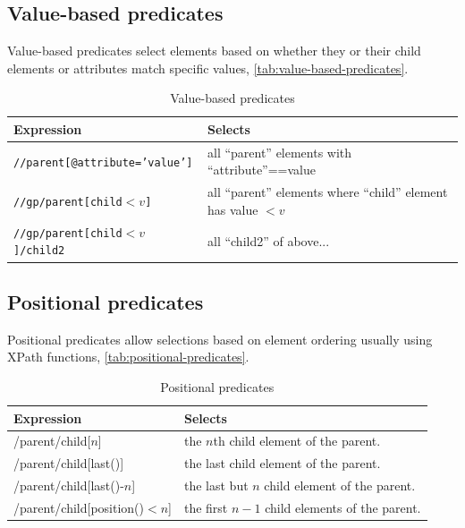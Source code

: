 \documentclass{pgnotes}
\begin{document}
\subsection{Value-based predicates}

Value-based predicates select elements based on whether they or their child elements or attributes match specific values, \autoref{tab:value-based-predicates}. 

  \begin{table}[htbp]
    \centering
    \begin{tabularx}{1.0\linewidth}{l X}
      \toprule
      \textbf{Expression} & \textbf{Selects} \\
      \midrule
      \texttt{//parent[@attribute='value']} &  all ``parent'' elements with ``attribute''==value \\
      \texttt{//gp/parent[child$<v$]} &  all ``parent'' elements where ``child'' element has value $<v$ \\
      \texttt{//gp/parent[child$<v$]/child2} &  all ``child2'' of above... \\
      \bottomrule
    \end{tabularx}
    \caption{Value-based predicates}
    \label{tab:value-based-predicates}
  \end{table}

\subsection{Positional predicates}

Positional predicates allow selections based on element ordering usually using XPath functions, \autoref{tab:positional-predicates}. 

\begin{table}[htbp]
  \centering
  \begin{tabularx}{1.0\linewidth}{l X}
    \toprule
    \textbf{Expression} & \textbf{Selects} \\
    \midrule
    /parent/child[$n$] & the $n$th child element of the parent. \\
    /parent/child[last()] & the last child element of the parent. \\
    /parent/child[last()-$n$] & the last but $n$ child element of the parent. \\
    /parent/child[position()$<n$] & the first $n-1$ child elements of the parent. \\
    \bottomrule
  \end{tabularx}
  \caption{Positional predicates}
  \label{tab:positional-predicates}
\end{table}
\end{document}

